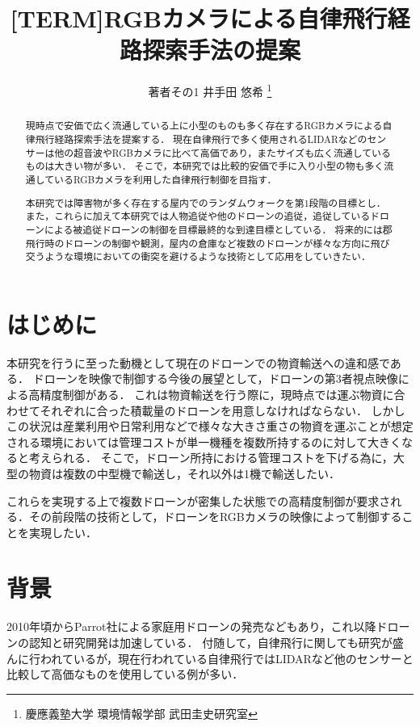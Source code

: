 \documentclass[a4j,10pt]{jsarticle}
\begin{document}

\title{[TERM]RGBカメラによる自律飛行経路探索手法の提案}

\author{
    著者その1 {井手田 悠希} \thanks{慶應義塾大学 環境情報学部 武田圭史研究室}
}

\begin{abstract}
現時点で安価で広く流通している上に小型のものも多く存在するRGBカメラによる自律飛行経路探索手法を提案する．
現在自律飛行で多く使用されるLIDARなどのセンサーは他の超音波やRGBカメラに比べて高価であり，またサイズも広く流通しているものは大きい物が多い．
そこで，本研究では比較的安価で手に入り小型の物も多く流通しているRGBカメラを利用した自律飛行制御を目指す．

本研究では障害物が多く存在する屋内でのランダムウォークを第1段階の目標とし．また，これらに加えて本研究では人物追従や他のドローンの追従，追従しているドローンによる被追従ドローンの制御を目標最終的な到達目標としている．
将来的には郡飛行時のドローンの制御や観測，屋内の倉庫など複数のドローンが様々な方向に飛び交うような環境においての衝突を避けるような技術として応用をしていきたい．

\end{abstract}

\maketitle
\thispagestyle{empty}

\section{はじめに}
本研究を行うに至った動機として現在のドローンでの物資輸送への違和感である．
ドローンを映像で制御する今後の展望として，ドローンの第3者視点映像による高精度制御がある．
これは物資輸送を行う際に，現時点では運ぶ物資に合わせてそれぞれに合った積載量のドローンを用意しなければならない．
しかしこの状況は産業利用や日常利用などで様々な大きさ重さの物資を運ぶことが想定される環境においては管理コストが単一機種を複数所持するのに対して大きくなると考えられる．
そこで，ドローン所持における管理コストを下げる為に，大型の物資は複数の中型機で輸送し，それ以外は1機で輸送したい．

これらを実現する上で複数ドローンが密集した状態での高精度制御が要求される．その前段階の技術として，ドローンをRGBカメラの映像によって制御することを実現したい．

\section{背景}
2010年頃からParrot社による家庭用ドローンの発売などもあり，これ以降ドローンの認知と研究開発は加速している．
付随して，自律飛行に関しても研究が盛んに行われているが，現在行われている自律飛行ではLIDARなど他のセンサーと比較して高価なものを使用している例が多い．
\end{document}
